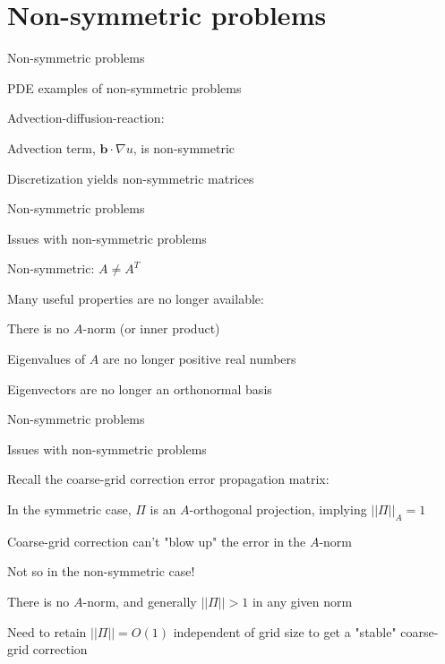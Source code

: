 \documentclass[18pt,xcolor=table]{beamer}
\begin{document}

\section{Non-symmetric problems}

\begin{frame}{Non-symmetric problems}
\begin{block}{PDE examples of non-symmetric problems}
\bit
\item Advection-diffusion-reaction:
\item Advection term, $\mathbf{b}\cdot\nabla u$, is non-symmetric
\item Discretization yields non-symmetric matrices
\eit
\end{block}
\end{frame}

\begin{frame}{Non-symmetric problems}
\begin{block}{Issues with non-symmetric problems}
\bit
\item Non-symmetric: $A\neq A^T$
\item Many useful properties are no longer available:
\bit
\item There is no $A$-norm (or inner product)
\item Eigenvalues of $A$ are no longer positive real numbers
\item Eigenvectors are no longer an orthonormal basis
\eit
\eit
\end{block}
\end{frame}

\begin{frame}{Non-symmetric problems}
\begin{block}{Issues with non-symmetric problems}
\bit
\item Recall the coarse-grid correction error propagation matrix:
\item In the symmetric case, $\Pi$ is an $A$-orthogonal projection, implying $||\Pi||_A=1$
\item Coarse-grid correction can't "blow up" the error in the $A$-norm
\item Not so in the non-symmetric case! 
\item There is no $A$-norm, and generally $||\Pi||>1$ in any given norm
\item Need to retain $||\Pi|| = O(1)$ independent of grid size to get a "stable" coarse-grid correction
\eit
\end{block}
\end{frame}
\end{document}
